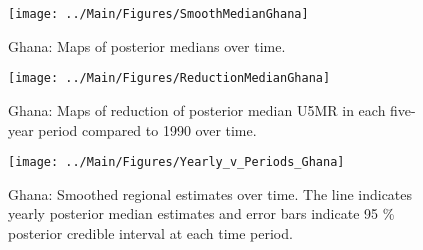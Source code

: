 \documentclass[12pt]{article}\usepackage[]{graphicx}\usepackage[]{color}
\newenvironment{knitrout}{}{} %
\begin{document}
\begin{knitrout}
\color{fgcolor}\begin{figure}[bht]

{\centering \texttt{[image: ../Main/Figures/SmoothMedianGhana]} 

}

\caption[Ghana]{Ghana: Maps of posterior medians over time.}\label{fig:unnamed-chunk-144}
\end{figure}


\end{knitrout}
\begin{knitrout}
\color{fgcolor}\begin{figure}[bht]

{\centering \texttt{[image: ../Main/Figures/ReductionMedianGhana]} 

}

\caption[Ghana]{Ghana: Maps of reduction of posterior median U5MR in each five-year period compared to 1990 over time.}\label{fig:unnamed-chunk-145}
\end{figure}


\end{knitrout}
\begin{knitrout}
\color{fgcolor}\begin{figure}[bht]

{\centering \texttt{[image: ../Main/Figures/Yearly\_v\_Periods\_Ghana]} 

}

\caption[Ghana]{Ghana: Smoothed regional estimates over time. The line indicates yearly posterior median estimates and error bars indicate 95 \% posterior credible interval at each time period.}\label{fig:unnamed-chunk-146}
\end{figure}


\end{knitrout}
\end{document}
